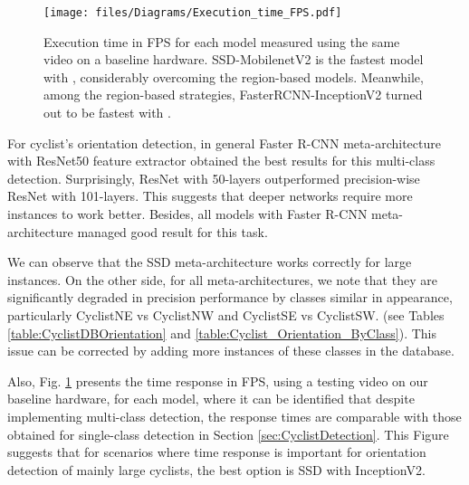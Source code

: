 \documentclass[journal]{IEEEtran}
\begin{document}
\begin{figure}[ht!]
\begin{center}
  \texttt{[image: files/Diagrams/Execution\_time\_FPS.pdf]}
\caption{Execution time in FPS for each model measured using the same video on a baseline hardware. SSD-MobilenetV2 is the fastest model with , considerably overcoming the region-based models. Meanwhile, among the  region-based strategies, FasterRCNN-InceptionV2 turned out to be fastest with .}
\label{fig:Cyclist_Orientation_FPS}       \end{center}
\end{figure}

For cyclist's orientation detection, in general Faster R-CNN meta-architecture with ResNet50 feature extractor obtained the best results for this multi-class detection. Surprisingly, ResNet with 50-layers outperformed precision-wise ResNet with 101-layers. This suggests that deeper networks require more instances to work better. Besides, all models with Faster R-CNN meta-architecture managed good result for this task. 



We can observe that the SSD meta-architecture works correctly for large instances. On the other side, for all meta-architectures, we note that they are significantly degraded in precision performance  by classes similar in appearance, particularly CyclistNE vs CyclistNW and CyclistSE vs CyclistSW. (see Tables \ref{table:CyclistDBOrientation} and \ref{table:Cyclist_Orientation_ByClass}). This issue can be corrected by adding more instances of these classes in the database.



Also, Fig. \ref{fig:Cyclist_Orientation_FPS} presents the time response in FPS, using a testing video on our baseline hardware, for each model, where it can be identified that despite implementing multi-class detection, the response times are comparable with those obtained for single-class detection in Section \ref{sec:CyclistDetection}. This Figure suggests that for scenarios where time response is important for orientation detection of mainly large cyclists, the best option is SSD with InceptionV2.
\end{document}
